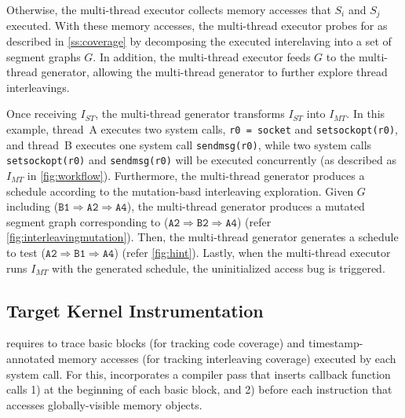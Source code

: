Otherwise, the multi-thread executor collects memory accesses that
$S_i$ and $S_j$ executed.
%
With these memory accesses, the multi-thread executor probes for
\intcov as described in \autoref{ss:coverage} by decomposing the
executed interelaving into a set of segment graphs $G$. In addition,
the multi-thread executor feeds $G$ to the multi-thread generator,
allowing the multi-thread generator to further explore thread
interleavings.



%
Once receiving $I_{ST}$, the multi-thread generator transforms
$I_{ST}$ into $I_{MT}$. In this example, thread~A executes two system
calls, \texttt{r0 = socket{}} and \texttt{setsockopt(r0)}, and
thread~B executes one system call \texttt{sendmsg(r0)}, while two
system calls \texttt{setsockopt(r0)} and \texttt{sendmsg(r0)} will be
executed concurrently (as described as $I_{MT}$ in
\autoref{fig:workflow}).
%
Furthermore, the multi-thread generator produces a schedule according
to the mutation-basd interleaving exploration. Given $G$ including
($\texttt{B1} \Rightarrow \texttt{A2} \Rightarrow \texttt{A4}$), the
multi-thread generator produces a mutated segment graph corresponding
to ($\texttt{A2} \Rightarrow \texttt{B2} \Rightarrow \texttt{A4}$)
(refer \autoref{fig:interleavingmutation}). Then, the multi-thread
generator generates a schedule to test
($\texttt{A2} \Rightarrow \texttt{B1} \Rightarrow \texttt{A4}$) (refer
\autoref{fig:hint}).
%
Lastly, when the multi-thread executor runs $I_{MT}$ with the
generated schedule, the uninitialized access bug is triggered.



\subsection{Target Kernel Instrumentation}
\label{ss:instrumentation}

\sys requires to trace basic blocks (for tracking code coverage) and
timestamp-annotated memory accesses (for tracking interleaving
coverage) executed by each system call.
%
For this, \sys incorporates a compiler pass that inserts callback
function calls 1) at the beginning of each basic block, and 2) before
each instruction that accesses globally-visible memory objects.
%



